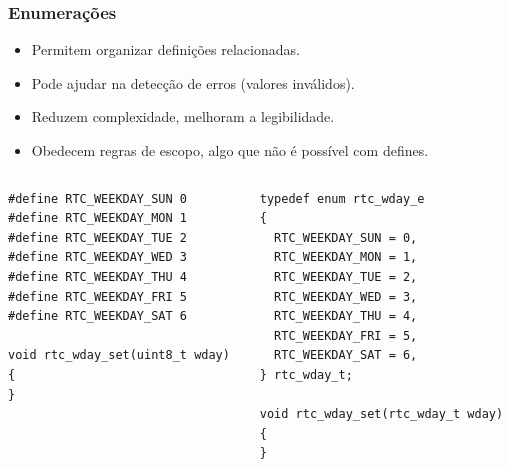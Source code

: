 \documentclass{beamer}
\begin{document}
\begin{frame}[fragile]
	\frametitle{Enumerações}
	\begin{itemize}
	\item Permitem organizar definições relacionadas.
	\item Pode ajudar na detecção de erros (valores inválidos).
	\item Reduzem complexidade, melhoram a legibilidade.
	\item Obedecem regras de escopo, algo que não é possível com defines.
	\end{itemize}
	\begin{columns}[T] %
		\begin{column}{.5\textwidth}
	\begin{lstlisting}[style=customc]
#define RTC_WEEKDAY_SUN 0
#define RTC_WEEKDAY_MON 1
#define RTC_WEEKDAY_TUE 2
#define RTC_WEEKDAY_WED 3
#define RTC_WEEKDAY_THU 4
#define RTC_WEEKDAY_FRI 5
#define RTC_WEEKDAY_SAT 6

void rtc_wday_set(uint8_t wday)
{
}
	\end{lstlisting}
		\end{column}%
		\hfill%
		\begin{column}{.5\textwidth}
	\begin{lstlisting}[style=customc]
typedef enum rtc_wday_e
{
  RTC_WEEKDAY_SUN = 0,
  RTC_WEEKDAY_MON = 1,
  RTC_WEEKDAY_TUE = 2,
  RTC_WEEKDAY_WED = 3,
  RTC_WEEKDAY_THU = 4,
  RTC_WEEKDAY_FRI = 5,
  RTC_WEEKDAY_SAT = 6,
} rtc_wday_t;

void rtc_wday_set(rtc_wday_t wday)
{
}
	\end{lstlisting}
		\end{column}%
	\end{columns}
\end{frame}
\end{document}
